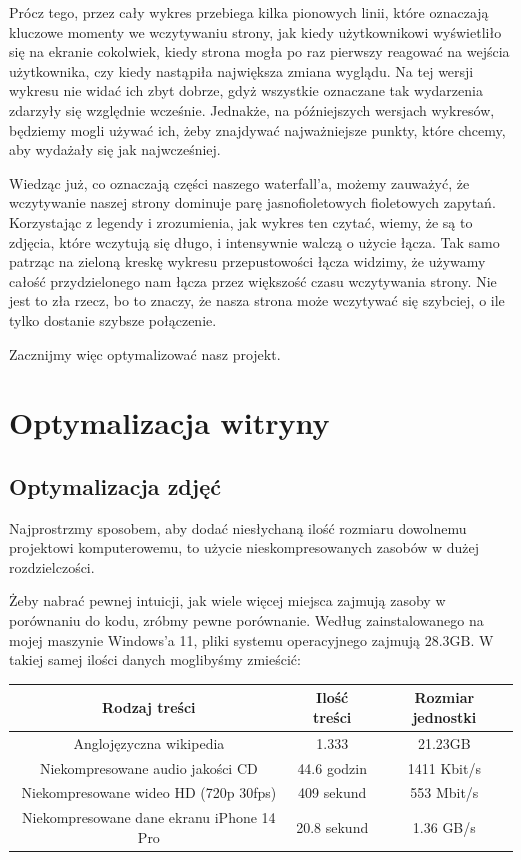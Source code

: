 \documentclass[licencjacka]{pracadypl}
\begin{document}
Prócz tego, przez cały wykres przebiega kilka pionowych linii, które oznaczają kluczowe momenty we wczytywaniu strony, jak kiedy użytkownikowi wyświetliło się na ekranie cokolwiek, kiedy strona mogła po raz pierwszy reagować na wejścia użytkownika, czy kiedy nastąpiła największa zmiana wyglądu. Na tej wersji wykresu nie widać ich zbyt dobrze, gdyż wszystkie oznaczane tak wydarzenia zdarzyły się względnie wcześnie. Jednakże, na późniejszych wersjach wykresów, będziemy mogli używać ich, żeby znajdywać najważniejsze punkty, które chcemy, aby wydażały się jak najwcześniej.

Wiedząc już, co oznaczają części naszego waterfall'a, możemy zauważyć, że wczytywanie naszej strony dominuje parę jasnofioletowych fioletowych zapytań. Korzystając z legendy i zrozumienia, jak wykres ten czytać, wiemy, że są to zdjęcia, które wczytują się długo, i intensywnie walczą o użycie łącza. Tak samo patrząc na zieloną kreskę wykresu przepustowości łącza widzimy, że używamy całość przydzielonego nam łącza przez większość czasu wczytywania strony. Nie jest to zła rzecz, bo to znaczy, że nasza strona może wczytywać się szybciej, o ile tylko dostanie szybsze połączenie.

Zacznijmy więc optymalizować nasz projekt.

\chapter{Optymalizacja witryny}
\section{Optymalizacja zdjęć}
Najprostrzmy sposobem, aby dodać niesłychaną ilość rozmiaru dowolnemu projektowi komputerowemu, to użycie nieskompresowanych zasobów w dużej rozdzielczości. 

Żeby nabrać pewnej intuicji, jak wiele więcej miejsca zajmują zasoby w porównaniu do kodu, zróbmy pewne porównanie. Według zainstalowanego na mojej maszynie Windows'a 11, pliki systemu operacyjnego zajmują $28.3\text{GB}$. W takiej samej ilości danych moglibyśmy zmieścić:

\begin{center}
  \begin{tabular}{|c|c|c|}
    \hline
    Rodzaj treści & Ilość treści & Rozmiar jednostki \\
    \hline
    Anglojęzyczna wikipedia\footnotemark[3] & 1.333 & 21.23GB \\ 
    Niekompresowane audio jakości CD & 44.6 godzin & 1411 Kbit/s \\
    Niekompresowane wideo HD (720p 30fps) & 409 sekund & 553 Mbit/s \\
    Niekompresowane dane ekranu iPhone 14 Pro & 20.8 sekund & 1.36 GB/s \\
    \hline
  \end{tabular}
\end{center}
\end{document}
